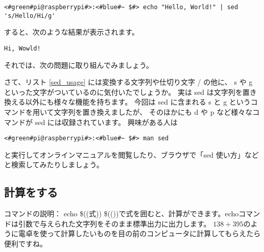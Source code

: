 \begin{lstlisting}[caption=sed コマンドを使った例, label=sed_app]
<#green#pi@raspberrypi#>:<#blue#~ $#> echo "Hello, World!" | sed 's/Hello/Hi/g'
\end{lstlisting}

すると、次のような結果が表示されます。

\begin{lstlisting}[caption=sed コマンドで変換した結果, label=sed_result]
Hi, Wowld!
\end{lstlisting}

それでは、次の問題に取り組んでみましょう。

\begin{tcolorbox}[title=\useOmetoi]
\begin{enumerate}
\end{enumerate}
\end{tcolorbox}

さて、リスト \ref{sed_usage} には変換する文字列や仕切り文字 / の他に、
s や g といった文字がついているのに気付いたでしょうか。
実は sed は文字列を置き換える以外にも様々な機能を持ちます。
今回は sed に含まれる s と g というコマンドを用いて文字列を置き換えましたが、
そのほかにも d や p など様々なコマンドが sed には収録されています。
興味がある人は

\begin{lstlisting}
<#green#pi@raspberrypi#>:<#blue#~ $#> man sed
\end{lstlisting}

と実行してオンラインマニュアルを閲覧したり、ブラウザで「sed 使い方」などと検索してみたりしましょう。

\subsection{計算をする}

コマンドの説明： echo \$((式))
\$(())で式を囲むと、計算ができます。echoコマンドは引数で与えられた文字列をそのまま標準出力に出力します。
$138 + 395$のように電卓を使って計算したいものを目の前のコンピュータに計算してもらえたら便利ですね。

